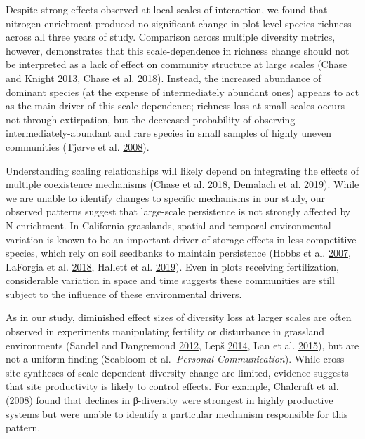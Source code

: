\documentclass[twoside,12pt,final]{ucthesis-CA2012}
\begin{document}
\begin{ucmainmatter}
Despite strong effects observed at local scales of interaction, we found that nitrogen enrichment produced no significant change in plot-level species richness across all three years of study. Comparison across multiple diversity metrics, however, demonstrates that this scale-dependence in richness change should not be interpreted as a lack of effect on community structure at large scales (Chase and Knight \protect\hyperlink{ref-chase2013}{2013}, Chase et al. \protect\hyperlink{ref-chase2018}{2018}). Instead, the increased abundance of dominant species (at the expense of intermediately abundant ones) appears to act as the main driver of this scale-dependence; richness loss at small scales occurs not through extirpation, but the decreased probability of observing intermediately-abundant and rare species in small samples of highly uneven communities (Tjørve et al. \protect\hyperlink{ref-tj2008}{2008}).

Understanding scaling relationships will likely depend on integrating the effects of multiple coexistence mechanisms (Chase et al. \protect\hyperlink{ref-chase2018}{2018}, Demalach et al. \protect\hyperlink{ref-demalach2019}{2019}). While we are unable to identify changes to specific mechanisms in our study, our observed patterns suggest that large-scale persistence is not strongly affected by N enrichment. In California grasslands, spatial and temporal environmental variation is known to be an important driver of storage effects in less competitive species, which rely on soil seedbanks to maintain persistence (Hobbs et al. \protect\hyperlink{ref-Hobbs2007}{2007}, LaForgia et al. \protect\hyperlink{ref-Laforgia2018}{2018}, Hallett et al. \protect\hyperlink{ref-hallett2019}{2019}). Even in plots receiving fertilization, considerable variation in space and time suggests these communities are still subject to the influence of these environmental drivers.

As in our study, diminished effect sizes of diversity loss at larger scales are often observed in experiments manipulating fertility or disturbance in grassland environments (Sandel and Dangremond \protect\hyperlink{ref-Sandel2012}{2012}, Lepš \protect\hyperlink{ref-lep2014}{2014}, Lan et al. \protect\hyperlink{ref-lan2015}{2015}), but are not a uniform finding (Seabloom et al.~\emph{Personal Communication}). While cross-site syntheses of scale-dependent diversity change are limited, evidence suggests that site productivity is likely to control effects. For example, Chalcraft et al. (\protect\hyperlink{ref-chalcraft2008}{2008}) found that declines in β-diversity were strongest in highly productive systems but were unable to identify a particular mechanism responsible for this pattern.


\end{ucmainmatter}
\end{document}
